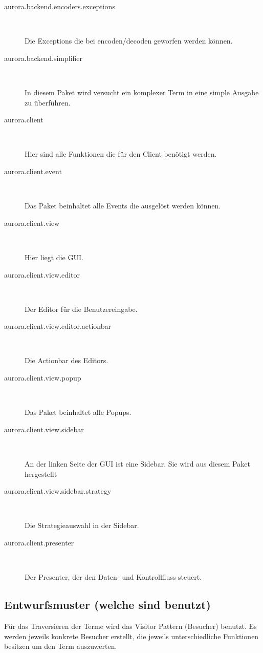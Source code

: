 \documentclass[parskip=full,11pt,twoside]{scrbook}
\begin{document}
\begin{description}
	\item[aurora.backend.encoders.exceptions] ~\par
	Die Exceptions die bei encoden/decoden geworfen werden können.
	
	\item[aurora.backend.simplifier] ~\par
	In diesem Paket wird versucht ein komplexer Term in eine simple Ausgabe zu überführen.
	
	\item[aurora.client] ~\par
	Hier sind alle Funktionen die für den Client benötigt werden.
	
	\item[aurora.client.event] ~\par
	Das Paket beinhaltet alle Events die ausgelöst werden können.
	
	\item[aurora.client.view] ~\par
	Hier liegt die GUI.
	
	\item[aurora.client.view.editor] ~\par
	Der Editor für die Benutzereingabe.
	
	\item[aurora.client.view.editor.actionbar] ~\par
	Die Actionbar des Editors.
	
	\item[aurora.client.view.popup] ~\par
	Das Paket beinhaltet alle Popups.
	
	\item[aurora.client.view.sidebar] ~\par
	An der linken Seite der GUI ist eine Sidebar. Sie wird aus diesem Paket hergestellt
	
	
	\item[aurora.client.view.sidebar.strategy] ~\par 
	Die Strategieauswahl in der Sidebar.
	
	\item[aurora.client.presenter] ~\par
	Der Presenter, der den Daten- und Kontrollfluss steuert.
\end{description}
\subsection{Entwurfsmuster (welche sind benutzt)}
Für das Traversieren der Terme wird das Visitor Pattern (Besucher) benutzt. Es werden jeweils konkrete Besucher erstellt, die jeweils unterschiedliche Funktionen besitzen um den Term auszuwerten.
\end{document}

